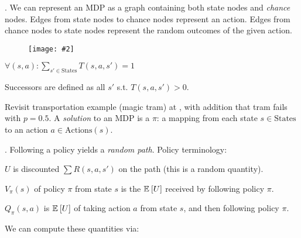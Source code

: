 \documentclass[11pt]{article}
\newcommand\myfig[2][0.3\textwidth]{\begin{figure}[h!]\centering\texttt{[image: \#2]}\end{figure}}
\newcommand\myspace[1][]{\vspace{#1\bigskipamount}\Needspace{10\baselineskip}}
\newcommand\p{\Needspace{10\baselineskip} \noindent}
\begin{document}
\myspace
{}. We can represent an MDP as a graph containing both state nodes and \textit{chance} nodes. Edges from state nodes to chance nodes represent an action. Edges from chance nodes to state nodes represent the random outcomes of the given action.
\myfig[0.4\textwidth]{figs/mdp_def.png}

\begin{compactitem}
	\item $\forall (s, a): \sum_{s' \in \text{States}} T(s, a, s') = 1$
	\item Successors are defined as all $s'$ s.t. $T(s, a, s') > 0$. 
\end{compactitem}
Revisit transportation example (magic tram) at , with addition that tram fails with $p = 0.5$.  A \textit{solution} to an MDP is a  $\pi$: a mapping from each state $s \in \text{States}$ to an action $a \in \text{Actions}(s)$. 

\myspace
\p {} . Following a policy yields a \textit{random path}. Policy terminology:
\begin{compactitem}
	\item  {} $U$ is discounted $\sum R(s, a, s')$ on the path (this is a random quantity).
	
	\item {} $V_{\pi}(s)$ of policy $\pi$ from state $s$ is the $\mathbb{E}_{}\left[U\right]$ received by following policy $\pi$.  
	
	\item {} $Q_\pi(s, a)$  is $\mathbb{E}_{}\left[U\right]$ of taking action $a$ from state $s$, and then following policy $\pi$. 
\end{compactitem}
We can compute these quantities via:
\end{document}
